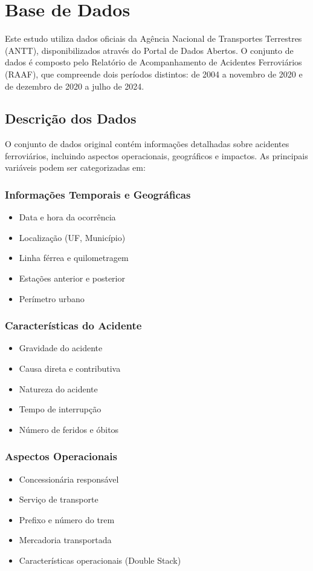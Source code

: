 \documentclass[conference]{IEEEtran}
\begin{document}
\section{Base de Dados}
Este estudo utiliza dados oficiais da Agência Nacional de Transportes Terrestres (ANTT), disponibilizados através do Portal de Dados Abertos. O conjunto de dados é composto pelo Relatório de Acompanhamento de Acidentes Ferroviários (RAAF), que compreende dois períodos distintos: de 2004 a novembro de 2020 e de dezembro de 2020 a julho de 2024.

\subsection{Descrição dos Dados}
O conjunto de dados original contém informações detalhadas sobre acidentes ferroviários, incluindo aspectos operacionais, geográficos e impactos. As principais variáveis podem ser categorizadas em:

\subsubsection{Informações Temporais e Geográficas}
\begin{itemize}
\item Data e hora da ocorrência
\item Localização (UF, Município)
\item Linha férrea e quilometragem
\item Estações anterior e posterior
\item Perímetro urbano
\end{itemize}

\subsubsection{Características do Acidente}
\begin{itemize}
\item Gravidade do acidente
\item Causa direta e contributiva
\item Natureza do acidente
\item Tempo de interrupção
\item Número de feridos e óbitos
\end{itemize}

\subsubsection{Aspectos Operacionais}
\begin{itemize}
\item Concessionária responsável
\item Serviço de transporte
\item Prefixo e número do trem
\item Mercadoria transportada
\item Características operacionais (Double Stack)
\end{itemize}
\end{document}
